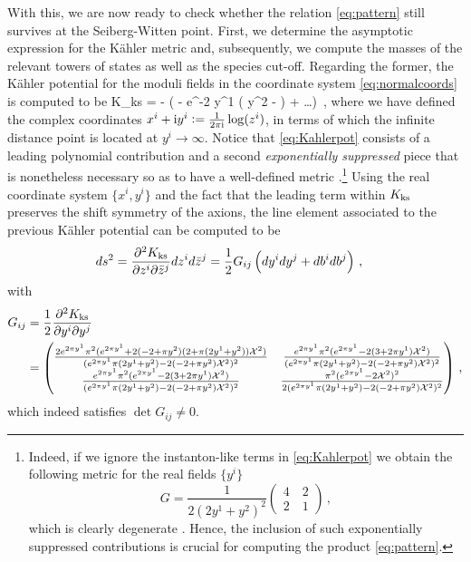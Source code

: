 With this, we are now ready to check whether the relation \eqref{eq:pattern} still survives at the Seiberg-Witten point. First, we determine the asymptotic expression for the K\"ahler metric and, subsequently, we compute the masses of the relevant towers of states as well as the species cut-off. Regarding the former, the K\"ahler potential for the moduli fields in the coordinate system \eqref{eq:normalcoords} is computed to be
%
\beq \label{eq:Kahlerpot}
	K_{\rm ks} = - \log \left(  -  e^{-2 \pi y^1} \left(  y^2 - \right) + \ldots\right)\, ,
\eeq
%
where we have defined the complex coordinates $x^i + \text{i} y^i := \frac{1}{2 \pi \text{i}} \log (z^i)$, in terms of which the infinite distance point is located at $y^i \to \infty$. Notice that \eqref{eq:Kahlerpot} consists of a leading polynomial contribution and a second \emph{exponentially suppressed} piece that is nonetheless necessary so as to have a well-defined metric \cite{Bastian:2021eom, Bastian:2021hpc}.\footnote{Indeed, if we ignore the instanton-like terms in \eqref{eq:Kahlerpot} we obtain the following metric for the real fields $\{ y^i\}$
\begin{equation}
    G = \frac{1}{2\left( 2 y^1 + y^2\right)^2} \begin{pmatrix}
		4 \quad  2\\2 \quad  1
	\end{pmatrix}\, ,
\end{equation}
which is clearly degenerate \cite{Bastian:2021eom}. Hence, the inclusion of such exponentially suppressed contributions is crucial for computing the product \eqref{eq:pattern}.} Using the real coordinate system $\{ x^i, y^i\}$ and the fact that the leading term within $K_{\rm ks}$ preserves the shift symmetry of the axions, the line element associated to the previous K\"ahler potential can be computed to be
%
\begin{align} \label{eq:lineelement}
	ds^2 &= \frac{\partial^2 K_{\rm ks}}{\partial z^i \partial \bar{z}^j} dz^i d\bar{z}^j = \frac12 G_{i j} \left( dy^i dy^j + db^idb^j\right)\, ,
\end{align}
%
with
%
\begin{align} \label{eq:realmetricSWpoint}
	G_{i j} &= \frac12 \frac{\partial^2 K_{\rm ks}}{\partial y^i \partial y^j} \notag\\
    &= \begin{pmatrix}
\frac{2 e^{2 \pi y^1} \pi^2 (e^{2 \pi y^1} + 2 (-2 + \pi y^2) (2 + \pi (2 y^1 + y^2)) \mathcal{X}^2)}{( e^{2 \pi y^1} \pi (2 y^1 + y^2) - 2 (-2 + \pi y^2) \mathcal{X}^2)^2} & \frac{ e^{2 \pi y^1} \pi^2 (e^{2 \pi y^1} - 2 (3 + 2 \pi y^1) \mathcal{X}^2)}{( e^{2 \pi y^1} \pi (2 y^1 + y^2) - 2 (-2 + \pi y^2) \mathcal{X}^2)^2} \\
\frac{ e^{2 \pi y^1} \pi^2 (e^{2 \pi y^1} - 2 (3 + 2 \pi y^1) \mathcal{X}^2)}{( e^{2 \pi y^1} \pi (2 y^1 + y^2) - 2 (-2 + \pi y^2) \mathcal{X}^2)^2} & \frac{\pi^2 (e^{2 \pi y^1} - 2 \mathcal{X}^2)^2}{2 ( e^{2 \pi y^1} \pi (2 y^1 + y^2) - 2 (-2 + \pi y^2) \mathcal{X}^2)^2}
\end{pmatrix}\, ,
\end{align}
%
which indeed satisfies $\det G_{ij} \neq 0$.

